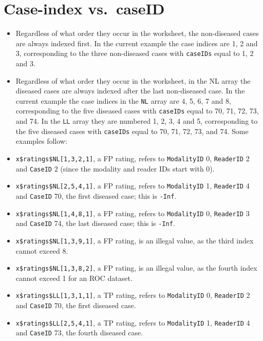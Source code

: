 \documentclass[
]{book}
\providecommand{\tightlist}{%
  \setlength{\itemsep}{0pt}\setlength{\parskip}{0pt}}
\begin{document}
\hypertarget{quick-start-read-datafile-correspondence-case-index-vs-case-id}{%
\section{Case-index vs.~caseID}\label{quick-start-read-datafile-correspondence-case-index-vs-case-id}}

\begin{itemize}
\tightlist
\item
  Regardless of what order they occur in the worksheet, the non-diseased cases are always indexed first. In the current example the case indices are 1, 2 and 3, corresponding to the three non-diseased cases with \texttt{caseIDs} equal to 1, 2 and 3.
\item
  Regardless of what order they occur in the worksheet, in the NL array the diseased cases are always indexed after the last non-diseased case. In the current example the case indices in the \texttt{NL} array are 4, 5, 6, 7 and 8, corresponding to the five diseased cases with \texttt{caseIDs} equal to 70, 71, 72, 73, and 74. In the \texttt{LL} array they are numbered 1, 2, 3, 4 and 5, corresponding to the five diseased cases with \texttt{caseIDs} equal to 70, 71, 72, 73, and 74. Some examples follow:
\item
  \texttt{x\$ratings\$NL{[}1,3,2,1{]}}, a FP rating, refers to \texttt{ModalityID} 0, \texttt{ReaderID} 2 and \texttt{CaseID} 2 (since the modality and reader IDs start with 0).
\item
  \texttt{x\$ratings\$NL{[}2,5,4,1{]}}, a FP rating, refers to \texttt{ModalityID} 1, \texttt{ReaderID} 4 and \texttt{CaseID} 70, the first diseased case; this is \texttt{-Inf}.
\item
  \texttt{x\$ratings\$NL{[}1,4,8,1{]}}, a FP rating, refers to \texttt{ModalityID} 0, \texttt{ReaderID} 3 and \texttt{CaseID} 74, the last diseased case; this is \texttt{-Inf}.
\item
  \texttt{x\$ratings\$NL{[}1,3,9,1{]}}, a FP rating, is an illegal value, as the third index cannot exceed 8.
\item
  \texttt{x\$ratings\$NL{[}1,3,8,2{]}}, a FP rating, is an illegal value, as the fourth index cannot exceed 1 for an ROC dataset.
\item
  \texttt{x\$ratings\$LL{[}1,3,1,1{]}}, a TP rating, refers to \texttt{ModalityID} 0, \texttt{ReaderID} 2 and \texttt{CaseID} 70, the first diseased case.
\item
  \texttt{x\$ratings\$LL{[}2,5,4,1{]}}, a TP rating, refers to \texttt{ModalityID} 1, \texttt{ReaderID} 4 and \texttt{CaseID} 73, the fourth diseased case.
\end{itemize}
\end{document}
